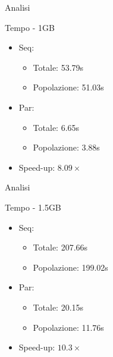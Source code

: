 \begin{frame}{Analisi}
    \begin{block}{Tempo - 1GB}
        \begin{itemize}
            \item Seq:
            \begin{itemize}
                \item Totale: 53.79s
                \item Popolazione: 51.03s
            \end{itemize}
            \item Par:
            \begin{itemize}
                \item Totale: 6.65s
                \item Popolazione: 3.88s
            \end{itemize}
            \item Speed-up: $8.09\times$
        \end{itemize}
    \end{block}
\end{frame}

\begin{frame}{Analisi}
    \begin{block}{Tempo - 1.5GB}
        \begin{itemize}
            \item Seq:
            \begin{itemize}
                \item Totale: 207.66s
                \item Popolazione: 199.02s
            \end{itemize}
            \item Par:
            \begin{itemize}
                \item Totale: 20.15s
                \item Popolazione: 11.76s
            \end{itemize}
            \item Speed-up: $10.3\times$
        \end{itemize}
    \end{block}
\end{frame}